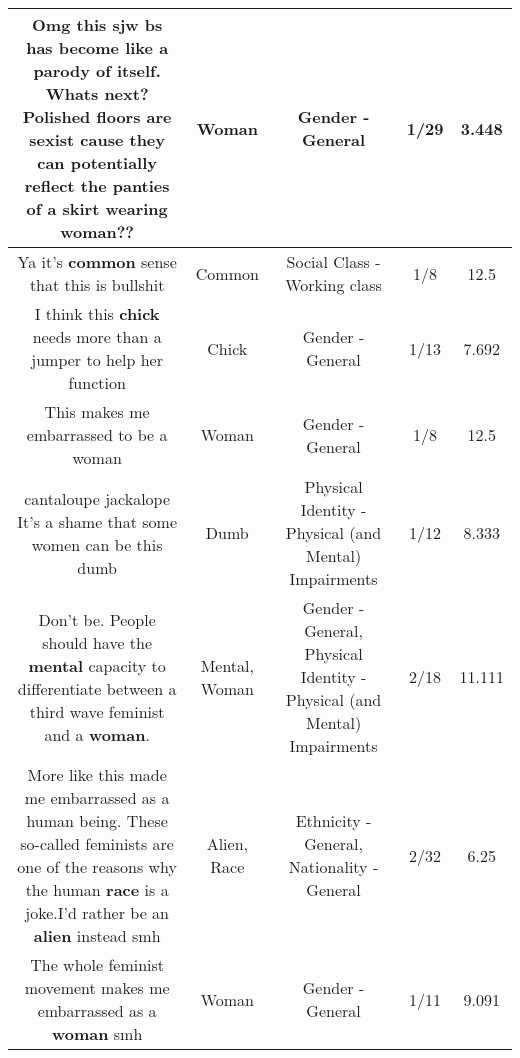 \documentclass[11pt]{article}
\newlength\mylength
\begin{document}
\begin{center}
\begin{longtable}{|C{.65\mylength}|C{.30\mylength}|C{.12\mylength}|C{.12\mylength}|C{.12\mylength}|}
  \small Omg this sjw bs has become like a parody of itself. Whats next? Polished floors are sexist cause they can potentially reflect the panties of a skirt wearing \textbf{woman}??\normalsize   & Woman & Gender - General & 1/29 & 3.448 \\  \hline
  \small Ya it's \textbf{common} sense that this is bullshit\normalsize   & Common & Social Class - Working class & 1/8 & 12.5 \\  \hline
  \small I think this \textbf{chick} needs more than a jumper to help her function\normalsize   & Chick & Gender - General & 1/13 & 7.692 \\  \hline
  \small This makes me embarrassed to be a woman\normalsize   & Woman & Gender - General & 1/8 & 12.5 \\  \hline
  \small cantaloupe jackalope It's a shame that some women can be this dumb\normalsize   & Dumb & Physical Identity - Physical (and Mental) Impairments & 1/12 & 8.333 \\  \hline
  \small Don't be. People should have the \textbf{mental} capacity to differentiate between a third wave feminist and a \textbf{woman}.\normalsize   & Mental, Woman & Gender - General, Physical Identity - Physical (and Mental) Impairments & 2/18 & 11.111 \\  \hline
  \small More like this made me embarrassed as a human being. These so-called feminists are one of the reasons why the human \textbf{race} is a joke.I'd rather be an \textbf{alien} instead smh\normalsize   & Alien, Race & Ethnicity - General, Nationality - General & 2/32 & 6.25 \\  \hline
  \small The whole feminist movement makes me embarrassed as a \textbf{woman} smh\normalsize   & Woman & Gender - General & 1/11 & 9.091 \\  \hline

\end{longtable}
\end{center}
\end{document}
